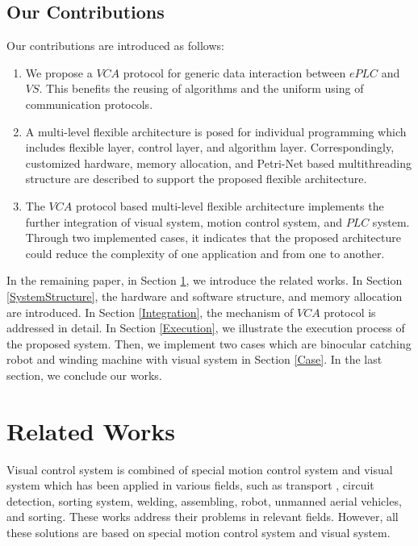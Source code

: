 \documentclass[journal,UTF8]{IEEEtran}
\begin{document}
\subsection{Our Contributions}
Our contributions are introduced as follows:
\begin{enumerate}
	\item We propose a $VCA$ protocol for generic data interaction between $ePLC$ and $VS$. This benefits the reusing of algorithms and the uniform using of communication protocols.
	\item A multi-level flexible architecture is posed for individual programming which includes flexible layer, control layer, and algorithm layer. Correspondingly, customized hardware, memory allocation, and Petri-Net based multithreading structure are described to support the proposed flexible architecture.
	\item The $VCA$ protocol based multi-level flexible architecture implements the further integration of visual system, motion control system, and $PLC$ system. Through two implemented cases, it indicates that the proposed architecture could reduce the complexity of one application and from one to another.  
\end{enumerate}

In the remaining paper, in Section \ref{RW}, we introduce the related works. In Section \ref{SystemStructure}, the hardware and software structure, and memory allocation are introduced. In Section \ref{Integration}, the mechanism of $VCA$ protocol is addressed in detail. In Section \ref{Execution}, we illustrate the execution process of the proposed system. Then, we implement two cases which are binocular catching robot and winding machine with visual system in Section \ref{Case}. In the last section, we conclude our works.

\section{Related Works}
\label{RW}
Visual control system is combined of special motion control system and visual system which has been applied in various fields, such as transport \cite{Xing2014Intersection}, circuit detection\cite{Nian2005An}, sorting system, welding\cite{Chen2014A}, assembling\cite{Wang2008Visual,Xiao2014Visual}, robot\cite{Wu2013Cloud,Tsai2017A}, unmanned aerial vehicles\cite{Guenard2010A,Serra2016Landing}, and sorting\cite{Sun2013Automatic}. These works address their problems in relevant fields. However, all these solutions are based on special motion control system and visual system.
\end{document}
